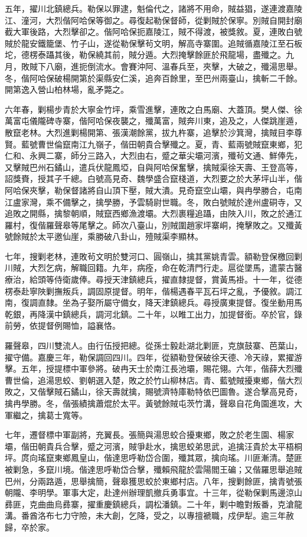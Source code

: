 \begin{pinyinscope}
五年，擢川北鎮總兵。勒保以罪逮，魁倫代之，諸將不用命，賊益猖，遂連渡嘉陵江、潼河，大烈偕阿哈保等御之。尋復起勒保督師，從剿賊於保寧。別賊自開封廟截大軍後路，大烈擊卻之。偕阿哈保扼嘉陵江，賊不得渡，被獎敘。夏，連敗白號賊於龍安鐵籠堡、竹子山，遂從勒保擊茍文明，解高寺寨圍。追賊循嘉陵江至石板坨，德楞泰躡其後，勒保繞其前，賊分遁。大烈掩擊餘匪於飛龍場，盡殲之。九月，敗賊下八廟，進扼倒流水。會賽沖阿、溫春兵至，夾擊，大破之，殲湯思舉。冬，偕阿哈保破楊開第於渠縣安仁溪，追奔百餘里，至巴州兩臺山，擒斬二千餘。開第逸入營山柏林場，亂矛斃之。

六年春，剿楊步青於大寧金竹坪，乘雪進擊，連敗之白馬廟、大蓋頂。樊人傑、徐萬富屯儀隴碑寺寨，偕阿哈保夜襲之，殲萬富，賊奔川東，追及之，人傑跳崖遁，散竄老林。大烈進剿楊開第、張漢潮餘黨，拔九杵寨，追擊於沙箕灣，擒賊目李尊賢。藍號曹世倫竄南江九嶺子，偕田朝貴合擊殲之。夏，青、藍兩號賊竄東鄉，犯仁和、永興二寨，師分三路入，大烈由右，蹙之華尖壩河濱，殲茍文通、鮮俸先，又擊賊巴州石鐍山，遣兵伏龍鳳埡，自與阿哈保奮擊，擒賊渠徐天壽、王登高等，詔獎賚，授其子千總。白號高見奇、魏學盛合竄棧道，大烈要之於大茅坪山半，偕阿哈保夾擊，勒保督諸將自山頂下壓，賊大潰。見奇竄空山壩，與冉學勝合，屯南江盧家灣，乘不備擊之，擒學勝，予雲騎尉世職。冬，敗白號賊於達州盧硐寺，又追敗之開縣，擒黎朝順，賊竄西鄉漁渡壩。大烈裹糧追躡，由陜入川，敗之於通江羅村，復偕羅聲皋等尾擊之。師次八臺山，別賊圍趙家坪寨峒，掩擊敗之。又殲黃號餘賊於太平邀仙崖，乘勝破八卦山，殪賊渠李顯林。

七年，搜剿老林，連敗茍文明於雙河口、圓嶺山，擒其黨姚青雲。額勒登保檄回剿川賊，大烈乞病，解職回籍。九年，病痊，命在乾清門行走。扈從墜馬，遣蒙古醫療治，給頭等侍衛歲俸。尋授天津鎮總兵，擢直隸提督，賞黃馬褂。十一年，從德楞泰赴寧陜剿撫叛兵，調固原提督。明年，偕楊遇春平瓦石坪之亂，予優敘。調江南，復調直隸。坐為子娶所屬守備女，降天津鎮總兵。尋授廣東提督。復坐動用馬乾銀，再降漢中鎮總兵，調河北鎮。二十年，以睢工出力，加提督銜。卒於官，錄前勞，依提督例賜恤，謚襄恪。

羅聲皋，四川雙流人。由行伍授把總。從孫士毅赴湖北剿匪，克旗鼓寨、芭葉山，擢守備。嘉慶三年，勒保調回四川。四年，從額勒登保破徐天德、冷天祿，累擢游擊。五年，授提標中軍參將。破冉天士於南江長池壩，賜花翎。六年，偕薛大烈殲曹世倫，追湯思蛟、劉朝選入楚，敗之於竹山柳林店。青、藍號賊擾東鄉，偕大烈敗之，又偕擊賊石鐍山，徐天壽就擒，賜號濟特庫勒特依巴圖魯。遂合擊高見奇，擒冉學勝。冬，偕張績擒蕭焜於太平。黃號餘賊屯茨竹溝，聲皋自花角園進攻，大軍繼之，擒葛士寬等。

七年，遷督標中軍副將，充翼長。張簡與湯思蛟合擾東鄉，敗之於老生園、楊家壩，偕田朝貴兵合擊，蹙之河濱，賊爭赴水，擒思蛟弟思武，追擒汪貴於太平梧桐坪。庹向瑤竄東鄉鳳皇山，偕達思呼勒岱合圍，殲其眾，擒向瑤。川匪漸清。楚匪被剿急，多竄川境。偕達思呼勒岱合擊，殲賴飛龍於雲陽閻王碥；又偕羅思舉追賊巴州，分兩路遁，思舉擒簡，聲皋獲思蛟於東鄉村店。八年，搜剿餘匪，擒青號張朝隴、李明學。軍事大定，赴達州辦理凱撤兵勇事宜。十三年，從勒保剿馬邊涼山彞匪，克曲曲烏彞寨，擢重慶鎮總兵，調松潘鎮。二十年，剿中瞻對叛番，克滄龍溝。番酋洛布七力守險，未大創，乞降，受之，以專擅褫職，戍伊犁。逾三年赦歸，卒於家。


\end{pinyinscope}
